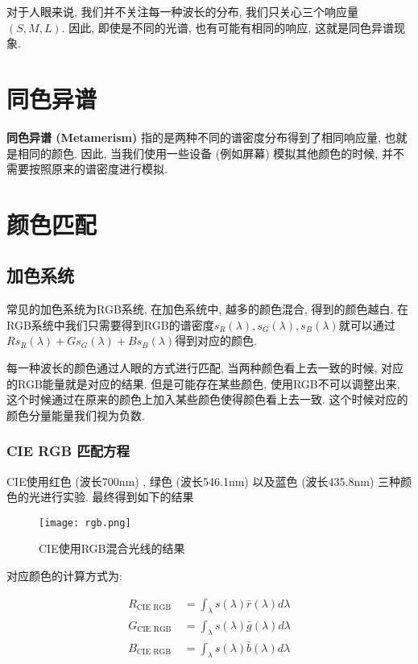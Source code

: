 \documentclass[openany]{progbookcn}
\begin{document}
对于人眼来说, 我们并不关注每一种波长的分布, 我们只关心三个响应量$(S,M,L)$. 因此, 即使是不同的光谱, 也有可能有相同的响应, 这就是同色异谱现象. 

\section{同色异谱}

\textbf{同色异谱 (Metamerism) }指的是两种不同的谱密度分布得到了相同响应量, 也就是相同的颜色. 因此, 当我们使用一些设备 (例如屏幕) 模拟其他颜色的时候, 并不需要按照原来的谱密度进行模拟. 

\section{颜色匹配}

\subsection{加色系统}

常见的加色系统为RGB系统, 在加色系统中, 越多的颜色混合, 得到的颜色越白. 在RGB系统中我们只需要得到RGB的谱密度$s_R(\lambda), s_G(\lambda), s_B(\lambda)$就可以通过$R s_{R}(\lambda)+G s_{G}(\lambda)+B s_{B}(\lambda)$得到对应的颜色. 

每一种波长的颜色通过人眼的方式进行匹配, 当两种颜色看上去一致的时候, 对应的RGB能量就是对应的结果. 但是可能存在某些颜色, 使用RGB不可以调整出来, 这个时候通过在原来的颜色上加入某些颜色使得颜色看上去一致. 这个时候对应的颜色分量能量我们视为负数. 

\subsubsection{CIE RGB 匹配方程}

CIE使用红色 (波长700nm) , 绿色 (波长546.1nm) 以及蓝色 (波长435.8nm) 三种颜色的光进行实验. 最终得到如下的结果

\begin{figure}[H]
	\centering
	\texttt{[image: rgb.png]}
	\caption{CIE使用RGB混合光线的结果}
	\label{fig:rgb}
\end{figure}

对应颜色的计算方式为: 

\begin{equation}
	\begin{split}
		R_{\mathrm{CIE} \text { RGB }} &=\int_{\lambda} s(\lambda) \bar{r}(\lambda) d \lambda \\
		G_{\mathrm{CIE} \text { RGB }} &=\int_{\lambda} s(\lambda) \bar{g}(\lambda) d \lambda \\
		B_{\mathrm{CIE} \text { RGB }} &=\int_{\lambda} s(\lambda) \bar{b}(\lambda) d \lambda
	\end{split}
\end{equation}
\end{document}
